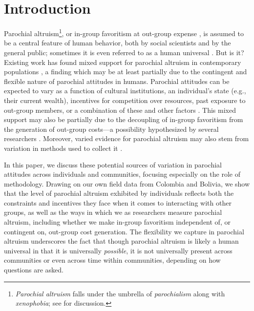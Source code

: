 \documentclass[bibauthoryear]{aa}
\begin{document}


\section{Introduction}\label{firstbit}
Parochial altruism\footnote{\emph{Parochial altruism} falls under the umbrella of \emph{parochialism} along with \emph{xenophobia}; see \citet{hruschka2013economic} for discussion.}, or in-group favoritism at out-group expense \citep{choi2007coevolution}, is assumed to be a central feature of human behavior, both by social scientists and by the general public; sometimes it is even referred to as a human universal \citep{greene2013moral}. But is it? Existing work has found mixed support for parochial altruism in contemporary populations \citep{Rusch2014}, a finding which may be at least partially due to the contingent and flexible nature of parochial attitudes in humans. Parochial attitudes can be expected to vary as a function of cultural institutions, an individual's state (e.g., their current wealth), incentives for competition over resources,  past exposure to out-group members, or a combination of these and other factors \citep{pisor2019evolution}. This mixed support may also be partially due to the decoupling of in-group favoritism from the generation of out-group costs---a possibility hypothesized by several researchers \citep{purzycki2019identity, hruschka2013economic, yamagishi2016parochial, brewer2006evolutionary, schaub2017threat, cashdan2001ethnocentrism}. Moreover, varied evidence for parochial altruism may also stem from variation in methods used to collect it \citep{Pisor2020}.



In this paper, we discuss these potential sources of variation in parochial attitudes across individuals and communities, focusing especially on the role of methodology. Drawing on our own field data from Colombia and Bolivia, we show that the level of  parochial altruism  exhibited by individuals reflects both the constraints and incentives they face when it comes to interacting with other groups, as well as the ways in which we as researchers measure parochial altruism, including whether we make in-group favoritism independent of, or contingent on, out-group cost generation. The flexibility we capture in parochial altruism underscores the fact that though parochial altruism is likely a human universal in that it is universally \textit{possible}, it is not universally present across communities or even across time within communities, depending on how questions are asked.
\end{document}
